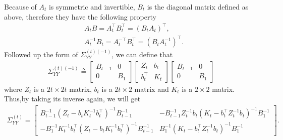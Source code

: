 Because of $A_t$ is symmetric and invertible, $B_t$ is the diagonal matrix defined as above, therefore they have the following property 
\begin{align*}
& A_tB=A_t^\top B_t^\top = \left(B_tA_t\right)^\top, \\
& A_t^{-1}B_t = A_t^{-\top}B_t^\top = \left(B_tA_t^{-1}\right)^\top. 
\end{align*}
Followed up the form of $\Sigma_{YY}^{(t) (-1)}$, we can define that 
\begin{align*}
\Sigma_{YY}^{(t) (-1)} \triangleq \begin{bmatrix} 
B_{t-1} & 0 \\ 0 & B_1 \end{bmatrix}
\begin{bmatrix} 
Z_{t} & b_{t} \\
b_{t}^\top & K_{t}
\end{bmatrix} \begin{bmatrix} 
B_{t-1} & 0 \\ 0 & B_1\end{bmatrix}
\end{align*}
where $Z_{t}$ is a $2t \times 2t$ matrix, $ b_{t} $ is a $2t \times 2$ matrix and $K_{t}$ is a $2 \times 2$ matrix. Thus,by taking its inverse again, we will get 
\begin{align*} \Sigma_{YY}^{\left(t\right)}= \left[ \begin{matrix}
B_{t-1}^{-1} \left(Z_{t}-b_{t}K_{t}^{-1}b_{t}^\top\right)^{-1}B_{t-1}^{-1}  & - B_{t-1}^{-1}  Z_{t}^{-1}b_{t}\left(K_{t}-b_{t}^\top Z_{t}^{-1}b_{t}\right)^{-1}B_1^{-1} \\
-B_1^{-1}  K_{t}^{-1}b_{t}^\top \left(Z_{t}-b_{t}K_{t}^{-1}b_{t}^\top\right)^{-1}B_{t-1}^{-1}  & B_1^{-1}  \left(K_{t}-b_{t}^\top Z_{t}^{-1}b_{t}\right)^{-1}B_1^{-1} 
\end{matrix}\right].
\end{align*}

